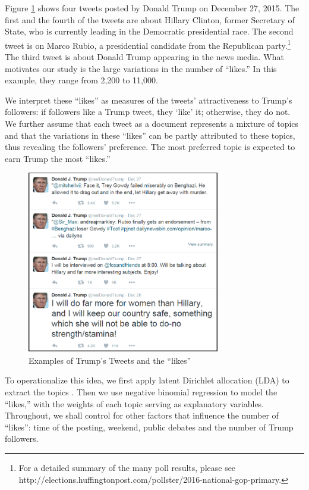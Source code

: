 \documentclass[letterpaper]{article}
\begin{document}
Figure \ref{gallery} shows four tweets posted by Donald Trump on December 27, 2015. The first and the fourth of the tweets are about Hillary Clinton, former Secretary of State, who is currently leading in the Democratic presidential race. The second tweet is on Marco Rubio, a presidential candidate from the Republican party.\footnote{For a detailed summary of the many poll results, please see http://elections.huffingtonpost.com/pollster/2016-national-gop-primary.} The third tweet is about Donald Trump appearing in the news media. What motivates our study is the large variations in the number of ``likes.'' In this example, they range from 2,200 to 11,000.

We interpret these ``likes'' as measures of the tweets' attractiveness to Trump's followers: if followers like a Trump tweet, they `like' it; otherwise, they do not. We further assume that each tweet as a document represents a mixture of topics and that the variations in these ``likes'' can be partly attributed to these topics, thus revealing the followers' preference. The most preferred topic is expected to earn Trump the most ``likes.''

\begin{figure}[H]
\caption{Examples of Trump's Tweets and the ``likes''}
\label{gallery}
\includegraphics[height=7.96cm]{trump-like-framed.png}
\end{figure}

To operationalize this idea, we first apply latent Dirichlet allocation (LDA) to extract the topics \cite{lda,LDA2}. Then we use negative binomial regression to model the ``likes,'' with the weights of each topic serving as explanatory variables. Throughout, we shall control for other factors that influence the number of ``likes'': time of the posting, weekend, public debates and the number of Trump followers.
\end{document}
